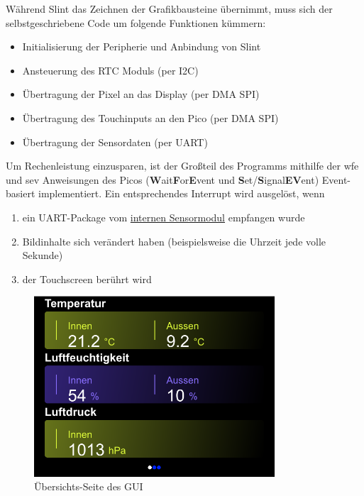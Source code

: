 \documentclass[a4paper,11pt]{article}
\begin{document}


\vspace{0.3cm}
\noindent
Während Slint das Zeichnen der Grafikbausteine übernimmt, muss sich der selbstgeschriebene Code um folgende Funktionen kümmern:
\begin{itemize}
	\item Initialisierung der Peripherie und Anbindung von Slint
	\item Ansteuerung des RTC Moduls (per I2C)
	\item Übertragung der Pixel an das Display (per DMA SPI)
	\item Übertragung des Touchinputs an den Pico (per DMA SPI)
	\item Übertragung der Sensordaten (per UART)
\end{itemize}

\vspace{0.3cm}
\noindent
Um Rechenleistung einzusparen, ist der Großteil des Programms mithilfe der wfe und sev Anweisungen des Picos (\textbf{W}ait\textbf{F}or\textbf{E}vent und \textbf{S}et/\textbf{S}ignal\textbf{EV}ent) Event-basiert implementiert.
Ein entsprechendes Interrupt wird ausgelöst, wenn
\begin{enumerate}
	\item ein UART-Package vom \hyperref[subsubsub:sensormodulInt]{internen Sensormodul} empfangen wurde
	\item Bildinhalte sich verändert haben (beispielsweise die Uhrzeit jede volle Sekunde)
	\item der Touchscreen berührt wird
\end{enumerate}



\begin{figure}[H]
	\centering
	\includegraphics[width=0.8\textwidth]{Overview}
	\caption{Übersichts-Seite des GUI}
	\label{fig:gui-overview}
\end{figure}
\end{document}
